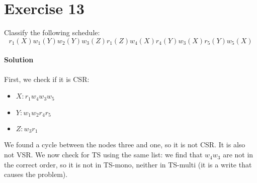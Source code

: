 \section{Exercise 13}

Classify the following schedule:
\[r_1(X) w_1(Y) w_2(Y) w_3(Z) r_1(Z) w_4(X) r_4(Y) w_3(X) r_5(Y) w_5(X)\] 

\paragraph*{Solution}
First, we check if it is CSR:
\begin{itemize}
    \item $X: r_1 w_4 w_3 w_5$
    \item $Y: w_1 w_2 r_4 r_5$
    \item $Z: w_3 r_1$
\end{itemize}
We found a cycle between the nodes three and one, so it is not CSR. It is also not VSR. We now check for TS using the same list: we find that $w_4 w_3$ are not in the correct order, so it is not in TS-mono, neither in TS-multi (it is a write that causes the problem).